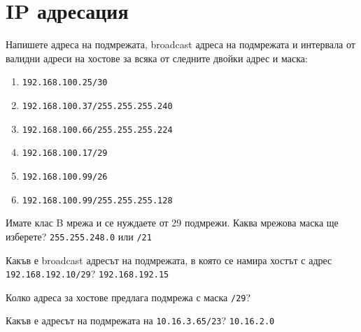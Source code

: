 \section{IP адресация}
\begin{q}
  Напишете адреса на подмрежата, broadcast адреса на подмрежата и интервала от
  валидни адреси на хостове за всяка от следните двойки адрес и маска:
  \begin{enumerate}
  \item \texttt{192.168.100.25/30}
  \item \texttt{192.168.100.37/255.255.255.240}
  \item \texttt{192.168.100.66/255.255.255.224}
  \item \texttt{192.168.100.17/29}
  \item \texttt{192.168.100.99/26}
  \item \texttt{192.168.100.99/255.255.255.128}
  \end{enumerate}
\end{q}

\begin{q}
  Имате клас B мрежа и се нуждаете от 29 подмрежи. Каква мрежова маска ще
  изберете? \rans \texttt{255.255.248.0} или \texttt{/21}
\end{q}

\begin{q}
  Какъв е broadcast адресът на подмрежата, в която се намира хостът с адрес
  \texttt{192.168.192.10/29}? \rans \texttt{192.168.192.15}
\end{q}

\begin{q}
  Колко адреса за хостове предлага подмрежа с маска \texttt{/29}? 
\end{q}

\begin{q}
  Какъв е адресът на подмрежата на \texttt{10.16.3.65/23}? \rans
  \texttt{10.16.2.0}
\end{q}

